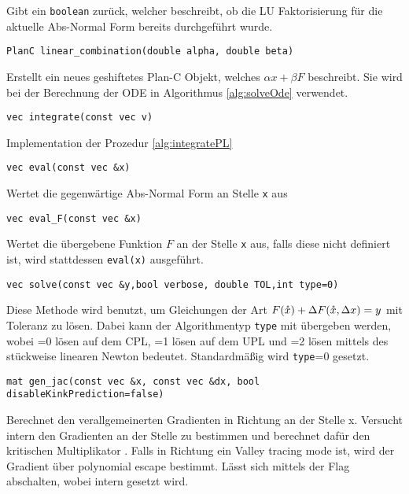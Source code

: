 Gibt ein \texttt{boolean} zurück, welcher beschreibt, ob die LU Faktorisierung für die aktuelle Abs-Normal Form bereits durchgeführt wurde.
\begin{lstlisting}[numbers=none]
PlanC linear_combination(double alpha, double beta)
\end{lstlisting}
Erstellt ein neues geshiftetes Plan-C Objekt, welches $\alpha x + \beta F$ beschreibt. Sie wird bei der Berechnung der ODE in Algorithmus \ref{alg:solveOde} verwendet.
\begin{lstlisting}[numbers=none]
vec integrate(const vec v)
\end{lstlisting}
Implementation der Prozedur \ref{alg:integratePL}
\begin{lstlisting}[numbers=none]
vec eval(const vec &x)
\end{lstlisting}
Wertet die gegenwärtige Abs-Normal Form an Stelle \texttt{x} aus
\begin{lstlisting}[numbers=none]
vec eval_F(const vec &x)
\end{lstlisting}
Wertet die übergebene Funktion $F$ an der Stelle \texttt{x} aus, falls diese nicht definiert ist, wird stattdessen \texttt{eval(x)} ausgeführt.
\begin{lstlisting}[numbers=none]
vec solve(const vec &y,bool verbose, double TOL,int type=0)
\end{lstlisting}
Diese Methode wird benutzt, um Gleichungen der Art $F(\mathring{x})+\Delta F(\mathring{x},\Delta x) = y$ mit Toleranz  zu lösen. Dabei kann der Algorithmentyp \texttt{type} mit übergeben werden, wobei =0 lösen auf dem CPL, =1 lösen auf dem UPL und =2 lösen mittels des stückweise linearen Newton bedeutet. Standardmäßig wird \texttt{type}=0 gesetzt.    
\begin{lstlisting}[numbers=none]
mat gen_jac(const vec &x, const vec &dx, bool disableKinkPrediction=false)
\end{lstlisting}
Berechnet den verallgemeinerten Gradienten in Richtung  an der Stelle \src x. Versucht intern den Gradienten an der Stelle  zu bestimmen und berechnet dafür den kritischen Multiplikator . Falls in Richtung  ein Valley tracing mode ist, wird der Gradient über polynomial escape bestimmt. Lässt sich mittels der Flag  abschalten, wobei intern  gesetzt wird.
